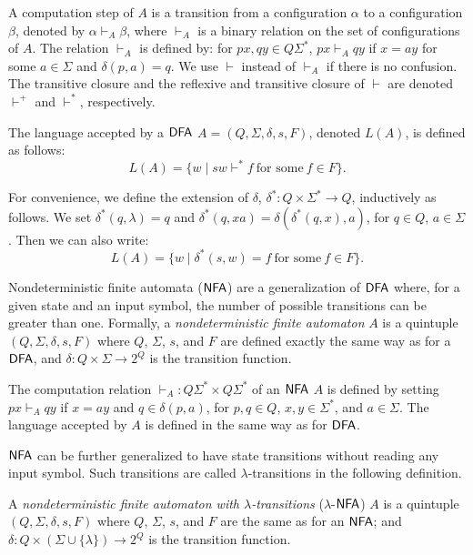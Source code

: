 A computation step of $A$ is a transition from a configuration $\alpha$ to a configuration $\beta$, denoted by $\alpha \vdash_A \beta$, where $\vdash_A$ is a binary relation on the set of configurations of $A$. The relation $\vdash_A$ is defined by: for $px, qy \in Q \Sigma^*$, $px \vdash_A qy$ if $x = ay$ for some $a \in \Sigma$ and $\delta(p, a) = q$. We use $\vdash$ instead of $\vdash_A$ if there is no confusion. The transitive closure and the reflexive and transitive closure of $\vdash$ are denoted $\vdash^+$ and $\vdash^*$, respectively.

The language accepted by a \index{$\DFA$}$\DFA$ $A = (Q, \Sigma, \delta, s, F)$, denoted $L(A)$, is defined as follows: $$L(A) = \{w \mid sw \vdash^* f \ \text{for some} \ f \in F\}.$$

For convenience, we define the extension of $\delta$, $\delta^*: Q \times \Sigma^* \to Q$, inductively as follows. We set $\delta^*(q, \lambda) = q$ and $\delta^*(q, xa) = \delta(\delta^*(q, x), a)$, for $q \in Q$, $a \in \Sigma$. Then we can also write: $$L(A) = \{w \mid \delta^*(s, w) = f \ \text{for some} \ f \in F\}.$$

Nondeterministic finite automata \index{$\NFA$}($\NFA$) are a generalization of \index{$\DFA$}$\DFA$ where, for a given state and an input symbol, the number of possible transitions can be greater than one. Formally, a  \emph{nondeterministic finite automaton} $A$ is a quintuple $(Q, \Sigma, \delta, s, F)$ where $Q$, $\Sigma$, $s$, and $F$ are defined exactly the same way as for a \index{$\DFA$}$\DFA$, and $\delta: Q \times \Sigma \to 2^Q$ is the transition function.

The computation relation $\vdash_A: Q \Sigma^* \times Q \Sigma^*$ of an \index{$\NFA$}$\NFA$ $A$ is defined by setting $px \vdash_A qy$ if $x = ay$ and $q \in \delta(p, a)$, for $p, q \in Q$, $x, y \in \Sigma^*$, and $a \in \Sigma$. The language accepted by $A$ is defined in the same way as for \index{$\DFA$}$\DFA$.

\index{$\NFA$}$\NFA$ can be further generalized to have state transitions without reading any input symbol. Such transitions are called  $\lambda$-transitions in the following definition.

A \emph{nondeterministic finite automaton with $\lambda$-transitions} \index{$\lambda$-$\NFA$}($\lambda$-$\NFA$) $A$ is a quintuple $(Q, \Sigma, \delta, s, F)$ where $Q$, $\Sigma$, $s$, and $F$ are the same as for an \index{$\NFA$}$\NFA$; and $\delta: Q \times (\Sigma \cup \{\lambda\}) \to 2^Q$ is the transition function.

